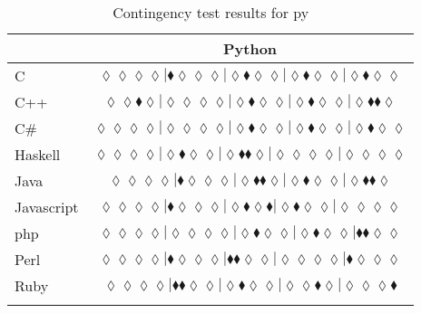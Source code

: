 \begin{table*}
\centering
\begin{tabular}{l c}
& Python \\
\hline

C & $\scriptscriptstyle\lozenge\lozenge\lozenge\lozenge|\blacklozenge\lozenge\lozenge\lozenge|\lozenge\blacklozenge\lozenge\lozenge|\lozenge\blacklozenge\lozenge\lozenge|\lozenge\blacklozenge\lozenge\lozenge$ \\
C++ & $\scriptscriptstyle\lozenge\lozenge\blacklozenge\lozenge|\lozenge\lozenge\lozenge\lozenge|\lozenge\blacklozenge\lozenge\lozenge|\lozenge\blacklozenge\lozenge\lozenge|\lozenge\blacklozenge\blacklozenge\lozenge$ \\
C\# & $\scriptscriptstyle\lozenge\lozenge\lozenge\lozenge|\lozenge\lozenge\lozenge\lozenge|\lozenge\blacklozenge\lozenge\lozenge|\lozenge\blacklozenge\lozenge\lozenge|\lozenge\blacklozenge\lozenge\lozenge$ \\
Haskell & $\scriptscriptstyle\lozenge\lozenge\lozenge\lozenge|\lozenge\blacklozenge\lozenge\lozenge|\lozenge\blacklozenge\blacklozenge\lozenge|\lozenge\lozenge\lozenge\lozenge|\lozenge\lozenge\lozenge\lozenge$ \\
Java & $\scriptscriptstyle\lozenge\lozenge\lozenge\lozenge|\blacklozenge\lozenge\lozenge\lozenge|\lozenge\blacklozenge\blacklozenge\lozenge|\lozenge\blacklozenge\lozenge\lozenge|\lozenge\blacklozenge\blacklozenge\lozenge$ \\
Javascript & $\scriptscriptstyle\lozenge\lozenge\lozenge\lozenge|\blacklozenge\lozenge\lozenge\lozenge|\lozenge\blacklozenge\lozenge\blacklozenge|\lozenge\blacklozenge\lozenge\lozenge|\lozenge\lozenge\lozenge\lozenge$ \\
{\sc php} & $\scriptscriptstyle\lozenge\lozenge\lozenge\lozenge|\lozenge\lozenge\lozenge\lozenge|\lozenge\blacklozenge\lozenge\lozenge|\lozenge\blacklozenge\lozenge\lozenge|\blacklozenge\blacklozenge\lozenge\lozenge$ \\
Perl & $\scriptscriptstyle\lozenge\lozenge\lozenge\lozenge|\blacklozenge\lozenge\lozenge\lozenge|\blacklozenge\blacklozenge\lozenge\lozenge|\lozenge\lozenge\lozenge\lozenge|\blacklozenge\lozenge\lozenge\lozenge$ \\
Ruby & $\scriptscriptstyle\lozenge\lozenge\lozenge\lozenge|\blacklozenge\blacklozenge\lozenge\lozenge|\lozenge\blacklozenge\lozenge\lozenge|\lozenge\lozenge\blacklozenge\lozenge|\lozenge\lozenge\lozenge\blacklozenge$ \\

\hline
& \\
\end{tabular}
\caption{Contingency test results for py}
\label{tbl:contingency-test-results-py}
\end{table*}


